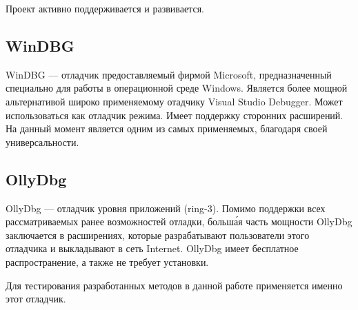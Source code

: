 Проект активно поддерживается и развивается.

\subsection{WinDBG}
WinDBG --- отладчик предоставляемый фирмой Microsoft, предназначенный специально
для работы в операционной среде Windows. Является более мощной альтернативой
широко применяемому отадчику Visual Studio Debugger. Может использоваться как
отладчик режима. Имеет поддержку сторонних расширений. На данный момент является
одним из самых применяемых, благодаря своей универсальности.

\subsection{OllyDbg}
OllyDbg --- отладчик уровня приложений (ring-3). Помимо поддержки всех
рассматриваемых ранее возможностей отладки, больш\'ая часть мощности OllyDbg
заключается в расширениях, которые разрабатывают пользователи этого отладчика и
выкладывают в сеть Internet. OllyDbg имеет бесплатное распространение, а также
не требует установки. 

Для тестирования разработанных методов в данной работе применяется именно этот
отладчик.
